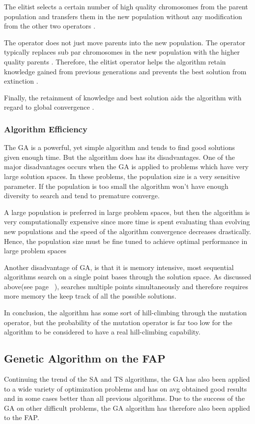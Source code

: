 The elitist selects a certain number of high quality chromosomes from the parent population and transfers them in the new population without any modification from the other two operators \cite{PatternDetectionGA}. 

The operator does not just move parents into the new population. The operator typically replaces sub par chromosomes in the new population with the higher quality parents \cite{RealParameterGASA}. Therefore, the elitist operator helps the algorithm retain knowledge gained from previous generations and prevents the best solution from extinction \cite{DynamicPenaltyGA}. 

Finally, the retainment of knowledge and best solution aids the algorithm with regard to global convergence \cite{SelfAdaptiveDataMiningGA}.

\subsubsection{Algorithm Efficiency}
The GA is a powerful, yet simple algorithm and tends to find good solutions given enough time. But the algorithm does has its disadvantages. One of the major disadvantages occurs when the GA is applied to problems which have very large solution spaces. In these problems, the population size is a very sensitive parameter. If the population is too small the algorithm won't have enough diversity to search and tend to premature converge. 

A large population is preferred in large problem spaces, but then the algorithm is very computationally expensive since more time is spent evaluating than evolving new populations and the speed of the algorithm convergence decreases drastically. Hence, the population size must be fine tuned to achieve optimal performance in large problem spaces

Another disadvantage of GA, is that it is memory intensive, most sequential algorithms search on a single point bases through the solution space. As discussed above(see page ~\pageref{GASearchPoints}), searches multiple points simultaneously and therefore requires more memory the keep track of all the possible solutions.

In conclusion, the algorithm has some sort of hill-climbing through the mutation operator, but the probability of the mutation operator is far too low for the algorithm to be considered to have a real hill-climbing capability.

\subsection{Genetic Algorithm on the FAP}
Continuing the trend of the SA and TS algorithms, the GA has also been applied to a wide variety of optimization problems and has on avg obtained good results and in some cases better than all previous algorithms. Due to the success of the GA on other difficult problems, the GA algorithm has therefore also been applied to the FAP.


